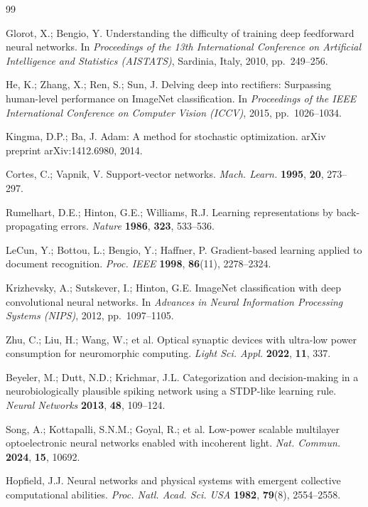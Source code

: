 \documentclass[pdflatex,sn-mathphys-num]{sn-jnl}%
\theoremstyle{thmstyleone}%
\theoremstyle{thmstyletwo}%
\theoremstyle{thmstylethree}%
\begin{document}
\begin{thebibliography}{99}

Glorot, X.; Bengio, Y. Understanding the difficulty of training deep feedforward neural networks.
In \textit{Proceedings of the 13th International Conference on Artificial Intelligence and Statistics (AISTATS)},
Sardinia, Italy, 2010, pp.~249--256.

He, K.; Zhang, X.; Ren, S.; Sun, J. Delving deep into rectifiers: Surpassing human-level performance on ImageNet classification.
In \textit{Proceedings of the IEEE International Conference on Computer Vision (ICCV)}, 2015, pp.~1026--1034.

Kingma, D.P.; Ba, J. Adam: A method for stochastic optimization.
arXiv preprint arXiv:1412.6980, 2014.

Cortes, C.; Vapnik, V. Support-vector networks.
\textit{Mach. Learn.} \textbf{1995}, \textbf{20}, 273--297.

Rumelhart, D.E.; Hinton, G.E.; Williams, R.J. Learning representations by back-propagating errors.
\textit{Nature} \textbf{1986}, \textbf{323}, 533--536.

LeCun, Y.; Bottou, L.; Bengio, Y.; Haffner, P. Gradient-based learning applied to document recognition.
\textit{Proc. IEEE} \textbf{1998}, \textbf{86}(11), 2278--2324.

Krizhevsky, A.; Sutskever, I.; Hinton, G.E. ImageNet classification with deep convolutional neural networks.
In \textit{Advances in Neural Information Processing Systems (NIPS)}, 2012, pp.~1097--1105.

Zhu, C.; Liu, H.; Wang, W.; et al. Optical synaptic devices with ultra-low power consumption for neuromorphic computing.
\textit{Light Sci. Appl.} \textbf{2022}, \textbf{11}, 337.

Beyeler, M.; Dutt, N.D.; Krichmar, J.L. Categorization and decision-making in a neurobiologically plausible spiking network using a STDP-like learning rule.
\textit{Neural Networks} \textbf{2013}, \textbf{48}, 109--124.

Song, A.; Kottapalli, S.N.M.; Goyal, R.; et al. Low-power scalable multilayer optoelectronic neural networks enabled with incoherent light.
\textit{Nat. Commun.} \textbf{2024}, \textbf{15}, 10692.

 Hopfield, J.J. Neural networks and physical systems with emergent collective computational abilities. \textit{Proc. Natl. Acad. Sci. USA} \textbf{1982}, \textbf{79}(8), 2554--2558. 


\end{thebibliography}
\end{document}

